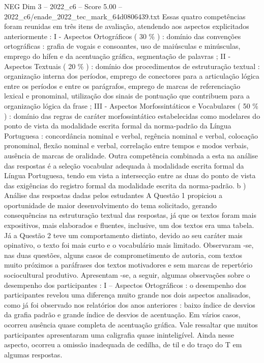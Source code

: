 \begin{textsample}{NEG Dim 3 – 2022\_c6 – Score 5.00 – 2022\_c6/enade\_2022\_tec\_mark\_64d0806439.txt}
Essas quatro competências foram reunidas em três itens de avaliação, atendendo aos aspectos explicitados anteriormente : I - Aspectos Ortográficos ( 30 \% ) : domínio das convenções ortográficas : grafia de vogais e consoantes, uso de maiúsculas e minúsculas, emprego do hífen e da acentuação gráfica, segmentação de palavras ; II - Aspectos Textuais ( 20 \% ) : domínio dos procedimentos de estruturação textual : organização interna dos períodos, emprego de conectores para a articulação lógica entre os períodos e entre os parágrafos, emprego de marcas de referenciação lexical e pronominal, utilização dos sinais de pontuação que contribuem para a organização lógica da frase ; III - Aspectos Morfossintáticos e Vocabulares ( 50 \% ) : domínio das regras de caráter morfossintático estabelecidas como modelares do ponto de vista da modalidade escrita formal da norma-padrão da Língua Portuguesa : concordância nominal e verbal, regência nominal e verbal, colocação pronominal, flexão nominal e verbal, correlação entre tempos e modos verbais, ausência de marcas de oralidade.
Outra competência combinada a esta na análise das respostas é a seleção vocabular adequada à modalidade escrita formal da Língua Portuguesa, tendo em vista a intersecção entre as duas do ponto de vista das exigências do registro formal da modalidade escrita da norma-padrão. b ) Análise das respostas dadas pelos estudantes A Questão 1 propiciou a oportunidade de maior desenvolvimento do tema solicitado, gerando consequências na estruturação textual das respostas, já que os textos foram mais expositivos, mais elaborados e fluentes, inclusive, um dos textos era uma tabela.
Já a Questão 2 teve um comportamento distinto, devido ao seu caráter mais opinativo, o texto foi mais curto e o vocabulário mais limitado.
Observaram -se, nas duas questões, alguns casos de comprometimento de autoria, com textos muito próximos a paráfrases dos textos motivadores e sem marcas de repertório sociocultural produtivo.
Apresentam -se, a seguir, algumas observações sobre o desempenho dos participantes : I – Aspectos Ortográficos : o desempenho dos participantes revelou uma diferença muito grande nos dois aspectos analisados, como já foi observado nos relatórios dos anos anteriores : baixo índice de desvios da grafia padrão e grande índice de desvios de acentuação.
Em vários casos, ocorreu ausência quase completa de acentuação gráfica.
Vale ressaltar que muitos participantes apresentaram uma caligrafia quase ininteligível.
Ainda nesse aspecto, ocorreu a omissão inadequada de cedilha, de til e do traço do T em algumas respostas.

\end{textsample}
